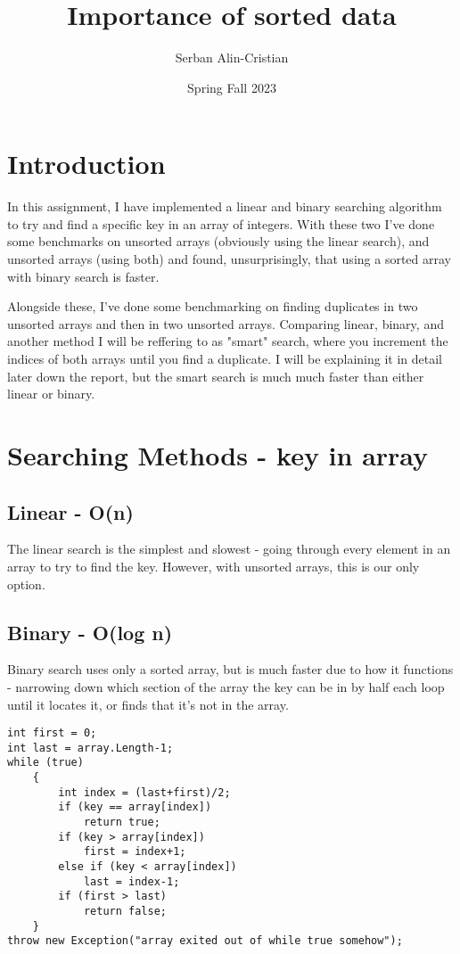 \documentclass[a4paper,11pt]{article}
\begin{document}
\title{
    \textbf{Importance of sorted data}
}
\author{Serban Alin-Cristian}
\date{Spring Fall 2023}

\maketitle

\section*{Introduction}

In this assignment, I have implemented a linear and binary searching algorithm to try and find a specific key in an array of integers. With these two I've done some benchmarks on unsorted arrays (obviously using the linear search), and unsorted arrays (using both) and found, unsurprisingly, that using a sorted array with binary search is faster.

Alongside these, I've done some benchmarking on finding duplicates in two unsorted arrays and then in two unsorted arrays. Comparing linear, binary, and another method I will be reffering to as "smart" search, where you increment the indices of both arrays until you find a duplicate. I will be explaining it in detail later down the report, but the smart search is much much faster than either linear or binary.

\section*{Searching Methods - key in array}
\subsection*{Linear - O(n)}
The linear search is the simplest and slowest - going through every element in an array to try to find the key. However, with unsorted arrays, this is our only option. 

\subsection*{Binary - O(log n)}
Binary search uses only a sorted array, but is much faster due to how it functions - narrowing down which section of the array the key can be in by half each loop until it locates it, or finds that it's not in the array.
\begin{verbatim}
int first = 0;
int last = array.Length-1;
while (true)
    {
        int index = (last+first)/2;
        if (key == array[index])
            return true;
        if (key > array[index])
            first = index+1;
        else if (key < array[index])
            last = index-1;
        if (first > last)
            return false;
    }
throw new Exception("array exited out of while true somehow");
\end{verbatim}
\end{document}
